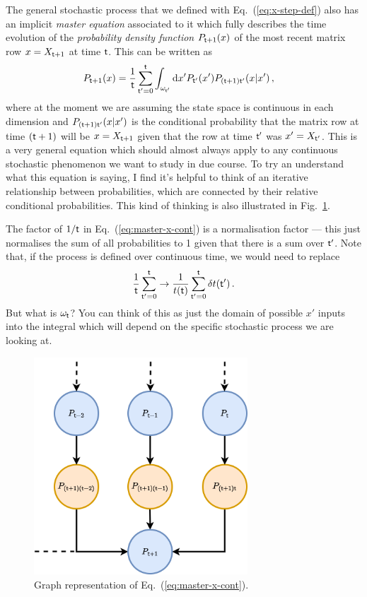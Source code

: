 \documentclass{book}
\begin{document}
The general stochastic process that we defined with Eq.~(\ref{eq:x-step-def}) also has an implicit \emph{master equation} associated to it which fully describes the time evolution of the \emph{probability density function} $P_{{\sf t}+1}(x)$ of the most recent matrix row $x=X_{{\sf t}+1}$ at time ${\sf t}$. This can be written as
\begin{align}
P_{{\sf t}+1}(x) &= \frac{1}{{\sf t}}\sum_{{\sf t}'=0}^{{\sf t}}\int_{\omega_{{\sf t}'}}{\rm d}x' P_{{\sf t}'}(x') P_{({\sf t}+1){\sf t}'}(x\vert x') \label{eq:master-x-cont} \,,
\end{align}
where at the moment we are assuming the state space is continuous in each dimension and $P_{({\sf t}+1){\sf t}'}(x\vert x')$ is the conditional probability that the matrix row at time $({\sf t}+1)$ will be $x=X_{{\sf t}+1}$ given that the row at time ${\sf t}'$ was $x'=X_{{\sf t}'}$. This is a very general equation which should almost always apply to any continuous stochastic phenomenon we want to study in due course. To try an understand what this equation is saying, I find it's helpful to think of an iterative relationship between probabilities, which are connected by their relative conditional probabilities. This kind of thinking is also illustrated in Fig.~\ref{fig:master-eqn}.

The factor of $1/{\sf t}$ in Eq.~(\ref{eq:master-x-cont}) is a normalisation factor --- this just normalises the sum of all probabilities to 1 given that there is a sum over ${\sf t}'$. Note that, if the process is defined over continuous time, we would need to replace 
\begin{align}
\frac{1}{{\sf t}}\sum_{{\sf t}'=0}^{{\sf t}} \rightarrow \frac{1}{t({\sf t})}\sum_{{\sf t}'=0}^{{\sf t}}\delta t({\sf t}') \,.
\end{align}
But what is $\omega_{\sf t}$? You can think of this as just the domain of possible $x'$ inputs into the integral which will depend on the specific stochastic process we are looking at.

\begin{figure}[h]
\centering
\includegraphics[width=8cm]{images/master-eq-graph.drawio.png}
\caption{Graph representation of Eq.~(\ref{eq:master-x-cont}).}
\label{fig:master-eqn}
\end{figure}
\end{document}
